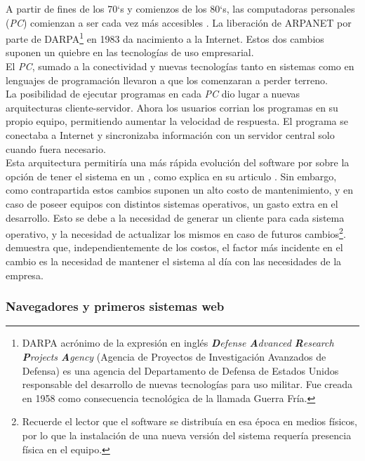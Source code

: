 A partir de fines de los 70`s y comienzos de los 80`s, las computadoras personales
(\emph{PC}) comienzan a ser cada vez más accesibles .
La liberación de ARPANET por parte de DARPA\footnote{
	DARPA acrónimo de la expresión en inglés \emph{\textbf{D}efense \textbf{A}dvanced
	\textbf{R}esearch \textbf{P}rojects \textbf{A}gency} (Agencia de Proyectos de
	Investigación Avanzados de Defensa) es una agencia del Departamento de Defensa de
	Estados Unidos responsable del desarrollo de nuevas tecnologías para uso militar.
	Fue creada en 1958 como consecuencia tecnológica de la llamada Guerra Fría.
} en 1983 da nacimiento a la Internet. Estos dos cambios suponen un quiebre
en las tecnologías de uso empresarial.\\
El \emph{PC}, sumado a la conectividad y nuevas tecnologías tanto en sistemas como en
lenguajes de programación llevaron a que los \mainframes comenzaran
a perder terreno.\\
La posibilidad de ejecutar programas en cada \emph{PC} dio lugar a nuevas arquitecturas
cliente-servidor. Ahora los usuarios corrian los programas en su propio equipo, permitiendo
aumentar la velocidad de respuesta. El programa se conectaba a Internet y sincronizaba
información con un servidor central solo cuando fuera necesario.\\
Esta arquitectura permitiría una más rápida evolución del software por sobre la opción de
tener el sistema en un \mainframe, como explica   en su
articulo . Sin embargo, como contrapartida  estos cambios
suponen un alto costo de mantenimiento, y en caso de poseer equipos con distintos sistemas
operativos, un gasto extra en el desarrollo. Esto se debe a la necesidad de generar un
cliente para cada sistema operativo, y la necesidad de actualizar los mismos en caso de
futuros cambios\footnote{
	Recuerde el lector que el software se distribuía en esa época en medios físicos, por
	lo que la instalación de una nueva versión del sistema requería presencia física en el
	equipo.
}.
demuestra que, independientemente de los costos, el factor más incidente en el cambio es la
necesidad de mantener el sistema al día con las necesidades de la empresa.

\subsubsection{Navegadores y primeros sistemas web}
\label{subsubsec:intro:about_web:web}

